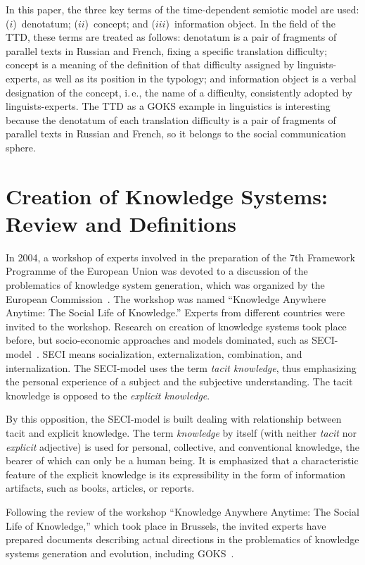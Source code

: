\begin{multicols}{2}
   In this paper, the three key terms of the time-dependent semiotic model are used: ($i$)~denotatum; 
($ii$)~concept; and ($iii$)~information object. In the field of the TTD, these terms are treated as follows: 
denotatum is a pair of fragments of parallel texts in Russian and French, fixing a specific 
translation difficulty; concept is a meaning of the definition of that difficulty assigned by 
linguists-experts, as well as its position in the typology; and information object is a verbal 
designation of the concept, i.\,e., the name of a difficulty, consistently adopted by 
   linguists-experts. The TTD as a GOKS example in linguistics is interesting because the 
denotatum of each translation difficulty is a pair of fragments of parallel texts in Russian and 
French, so it belongs to the social communication sphere.

\section{Creation of Knowledge Systems: Review and Definitions}

\noindent
In 2004, a workshop of experts involved in the preparation of the 7th Framework Programme 
of the European Union was devoted to a discussion of the problematics of knowledge system 
generation, which was organized by the European Commission~\cite{2bun}. The workshop was 
named ``Knowledge Anywhere Anytime: The Social Life of Knowledge.'' Experts from 
different countries were invited to the workshop. Research on creation of knowledge systems 
took place before, but socio-economic approaches and models dominated, such as 
   SECI-model~\cite{9bun}. SECI means socialization, externalization, combination, and 
internalization. The SECI-model uses the term \textit{tacit knowledge}, thus emphasizing the 
personal experience of a subject and the subjective understanding. The tacit knowledge is 
opposed to the \textit{explicit knowledge}.
   
   By this opposition, the SECI-model is built dealing with relationship between tacit and 
explicit knowledge. The term \textit{knowledge} by itself (with neither \textit{tacit} nor 
\textit{explicit} adjective) is used for personal, collective, and conventional knowledge, the 
bearer of which can only be a human being. It is emphasized that a characteristic feature of the 
explicit knowledge is its expressibility in the form of information artifacts, such as books, 
articles, or reports.
   
   Following the review of the workshop ``Knowledge Anywhere Anytime: The Social Life 
of Knowledge,'' which took place in Brussels, the invited experts have prepared documents 
describing actual directions in the problematics of knowledge systems generation and evolution, 
including GOKS~\cite{2bun}.
   

\end{multicols}
